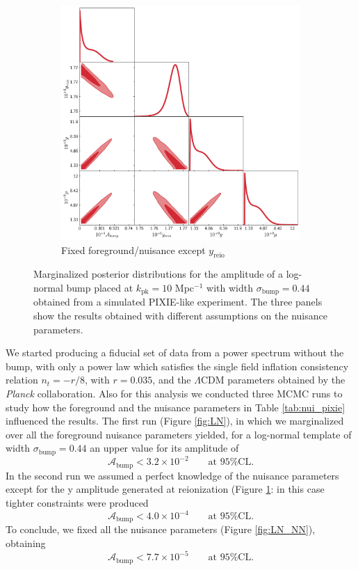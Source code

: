 \begin{figure}[ht!]
    \vspace{1em}

    \begin{subfigure}{0.5\textheight}
        \centering
        \includegraphics[width=1\textwidth]{Constraints/LN_NN_reio.pdf}
        \caption{Fixed foreground/nuisance except $y_\text{reio}$}
        \label{fig:LN_NN_reio}        
    \end{subfigure}
    \caption{Marginalized posterior distributions for the amplitude of a log-normal bump placed at $k_\text{pk}=10$ Mpc$^{-1}$ with width $\sigma_\text{bump}=0.44$ obtained from a simulated PIXIE-like experiment. The three panels show the results obtained with different assumptions on the nuisance parameters.}
    \label{fig:LN_all}
\end{figure}
We started producing a fiducial set of data from a power spectrum without the bump, with only a power law which satisfies the single field inflation consistency relation $n_t=-r/8$, with $r=0.035$, and the $\Lambda$CDM parameters obtained by the \emph{Planck} collaboration. 
Also for this analysis we conducted three MCMC runs to study how the foreground and the nuisance parameters in Table \ref{tab:nui_pixie} influenced the results. 
The first run (Figure \ref{fig:LN}), in which we marginalized over all the foreground nuisance parameters yielded, for a log-normal template of width $\sigma_\text{bump}=0.44$
an upper value for its amplitude of
$$\mathcal{A}_\text{bump}<3.2\times10^{-2}\qquad\text{at 95\% CL.}$$
In the second run we assumed a perfect knowledge of the nuisance parameters except for the y amplitude generated at reionization (Figure \ref{fig:LN_NN_reio}: in this case tighter constraints were produced 
$$\mathcal{A}_\text{bump}<4.0\times10^{-4}\qquad\text{at 95\% CL.}$$
To conclude, we fixed all the nuisance parameters (Figure \ref{fig:LN_NN}), obtaining
$$\mathcal{A}_\text{bump}<7.7\times10^{-5}\qquad\text{at 95\% CL.}$$

